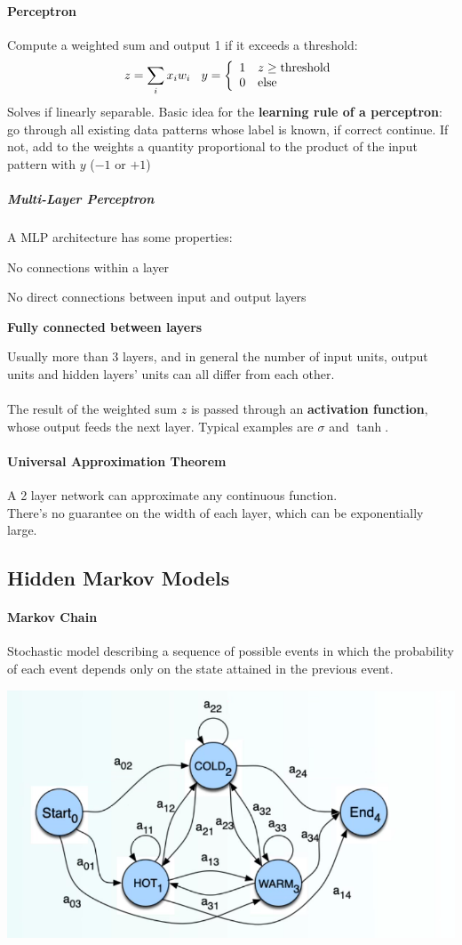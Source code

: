 \documentclass[10pt]{report}
\begin{document}
\paragraph{Perceptron} Compute a weighted sum and output 1 if it exceeds a threshold:
$$z=\sum_i x_iw_i \:\:\:\: y = \left\{ \begin{array}{l l}
1 & z\geq\hbox{threshold}\\
0 & \hbox{else}
\end{array} \right.$$
Solves if linearly separable. Basic idea for the \textbf{learning rule of a perceptron}: go through all existing data patterns whose label is known, if correct continue. If not, add to the weights a quantity proportional to the product of the input pattern with $y$ ($-1$ or $+1$)
\subparagraph{Multi-Layer Perceptron} A MLP architecture has some properties:
\begin{list}{}{}
	\item No connections within a layer
	\item No direct connections between input and output layers
	\item \textbf{Fully connected between layers}
\end{list}
Usually more than 3 layers, and in general the number of input units, output units and hidden layers' units can all differ from each other.\\\\
The result of the weighted sum $z$ is passed through an \textbf{activation function}, whose output feeds the next layer. Typical examples are $\sigma$ and $\tanh$.
\paragraph{Universal Approximation Theorem} A 2 layer network can approximate any continuous function.\\
There's no guarantee on the width of each layer, which can be exponentially large.
\subsection{Hidden Markov Models}
\paragraph{Markov Chain} Stochastic model describing a sequence of possible events in which the probability of each event depends only on the state attained in the previous event.
\begin{center}
	\includegraphics[scale=0.5]{12.png}
\end{center}
\end{document}
